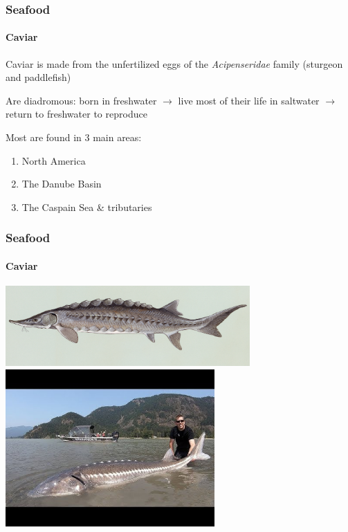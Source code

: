 \documentclass[10pt]{beamer}
\begin{document}
\begin{frame}[t]
\frametitle{Seafood}
\framesubtitle{Caviar}
\vspace{0.5cm}

	Caviar is made from the unfertilized eggs of the \emph{Acipenseridae} family (sturgeon and paddlefish)\\
	
	\vspace{0.5cm}
	
	Are diadromous: born in freshwater $\rightarrow$ live most of their life in saltwater $\rightarrow$ return to freshwater to reproduce\\
	
	\vspace{0.5cm}
	
	Most are found in 3 main areas:
		\medskip
		\begin{enumerate}
			\item North America
			\medskip
			\item The Danube Basin
			\medskip
			\item The Caspain Sea \& tributaries
		\end{enumerate}
\end{frame}


\begin{frame}
\frametitle{Seafood}
\framesubtitle{Caviar}

	\begin{center}
		\includegraphics[width=0.7\textwidth]{figures/sturgeon1.jpg}\\
		\vspace{0.5cm}
		\includegraphics[width=0.6\textwidth]{figures/sturgeon2.jpg}
	\end{center}
\end{frame}
\end{document}

